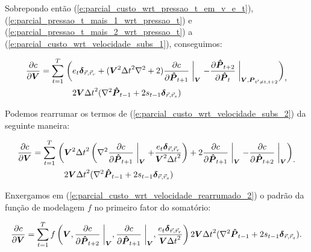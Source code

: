   Sobrepondo então (\ref{e:parcial_custo_wrt_pressao_t_em_v_e_t}), (\ref{e:parcial_pressao_t_mais_1_wrt_pressao_t}) e (\ref{e:parcial_pressao_t_mais_2_wrt_pressao_t}) a (\ref{e:parcial_custo_wrt_velocidade_subs_1}), conseguimos:

  \begin{equation} \label{e:parcial_custo_wrt_velocidade_subs_2}
    \begin{split}
      \frac{\partial c}{\partial \boldsymbol{V}} = 
      \sum \limits_{t=1}^T \biggm( &
        e_t \boldsymbol{\delta}_{\vec{r}, \vec{r}_r}
        + (\boldsymbol{V}^2 {\Delta t}^2 \nabla^2 + 2) \frac{\partial c}{\partial \boldsymbol{\hat{P}}_{t+1}} \biggm\lvert_{\boldsymbol{V}}
        - \frac{\partial \boldsymbol{\hat{P}}_{t+2}}{\partial \boldsymbol{\hat{P}}_{t}} \biggm\lvert_{\boldsymbol{V}, \boldsymbol{P}_{t'\ne t, t+2}}
      \biggm) \\
      & 2 \boldsymbol{V} {\Delta t}^2 (\nabla^2 \boldsymbol{\hat{P}}_{t-1} + 2 s_{t-1} \boldsymbol{\delta}_{\vec{r}, \vec{r}_s})
    \end{split}
    ,
  \end{equation}

  Podemos rearrumar os termos de (\ref{e:parcial_custo_wrt_velocidade_subs_2}) da seguinte maneira:

  \begin{equation} \label{e:parcial_custo_wrt_velocidade_rearrumado_2}
    \begin{split}
      \frac{\partial c}{\partial \boldsymbol{V}} =
      \sum \limits_{t=1}^T \biggm(
        & \boldsymbol{V}^2 {\Delta t}^2 \left(
          \nabla^2 \frac{\partial c}{\partial \boldsymbol{\hat{P}}_{t+1}} \biggm\lvert_{\boldsymbol{V}} + \frac{e_t \boldsymbol{\delta}_{\vec{r}, \vec{r}_r}}{\boldsymbol{V}^2 {\Delta t}^2}
        \right) + 2 \frac{\partial c}{\partial \boldsymbol{\hat{P}}_{t+1}} \biggm\lvert_{\boldsymbol{V}} -
        \frac{\partial c}{\partial \boldsymbol{\hat{P}}_{t+2}} \biggm\lvert_{\boldsymbol{V}}
      \biggm) \\
      & 2 \boldsymbol{V} {\Delta t}^2 (\nabla^2 \boldsymbol{\hat{P}}_{t-1} + 2 s_{t-1} \boldsymbol{\delta}_{\vec{r}, \vec{r}_s})
    \end{split}
    .
  \end{equation}

  \noindent Enxergamos em (\ref{e:parcial_custo_wrt_velocidade_rearrumado_2}) o padrão da função de modelagem $f$ no primeiro fator do somatório:

  \begin{equation} \label{e:parcial_custo_wrt_velocidade_propagacao_reversa}
    \frac{\partial c}{\partial \boldsymbol{V}} =
    \sum \limits_{t=1}^T
    f\left(\boldsymbol{V},
      \frac{\partial c}{\partial \boldsymbol{\hat{P}}_{t+2}} \biggm\lvert_{\boldsymbol{V}}, \frac{\partial c}{\partial \boldsymbol{\hat{P}}_{t+1}} \biggm\lvert_{\boldsymbol{V}}, \frac{e_t \boldsymbol{\delta}_{\vec{r}, \vec{r}_r}}{\boldsymbol{V} {\Delta t}^2}
    \right)
    2 \boldsymbol{V} {\Delta t}^2 (\nabla^2 \boldsymbol{\hat{P}}_{t-1} + 2 s_{t-1} \boldsymbol{\delta}_{\vec{r}, \vec{r}_s})
    .
  \end{equation}

